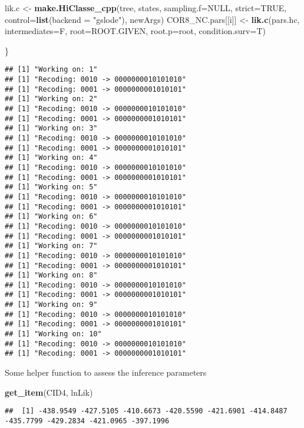 \documentclass[
]{article}
\newenvironment{Shaded}{\begin{snugshade}}{\end{snugshade}}
\newcommand{\AttributeTok}[1]{\textcolor[rgb]{0.13,0.29,0.53}{#1}}
\newcommand{\ConstantTok}[1]{\textcolor[rgb]{0.56,0.35,0.01}{#1}}
\newcommand{\FunctionTok}[1]{\textcolor[rgb]{0.13,0.29,0.53}{\textbf{#1}}}
\newcommand{\NormalTok}[1]{#1}
\newcommand{\OtherTok}[1]{\textcolor[rgb]{0.56,0.35,0.01}{#1}}
\newcommand{\StringTok}[1]{\textcolor[rgb]{0.31,0.60,0.02}{#1}}
\begin{document}
\begin{Shaded}
\begin{Highlighting}[]
\NormalTok{  lik.c }\OtherTok{\textless{}{-}} \FunctionTok{make.HiClasse\_cpp}\NormalTok{(tree, states,  }\AttributeTok{sampling.f=}\ConstantTok{NULL}\NormalTok{,  }\AttributeTok{strict=}\ConstantTok{TRUE}\NormalTok{, }\AttributeTok{control=}\FunctionTok{list}\NormalTok{(}\AttributeTok{backend =} \StringTok{"gslode"}\NormalTok{), newArgs)}
\NormalTok{  COR8\_NC.pars[[i]] }\OtherTok{\textless{}{-}} \FunctionTok{lik.c}\NormalTok{(pars.hc, }\AttributeTok{intermediates=}\NormalTok{F, }\AttributeTok{root=}\NormalTok{ROOT.GIVEN, }\AttributeTok{root.p=}\NormalTok{root, }\AttributeTok{condition.surv=}\NormalTok{T)}
  
\NormalTok{\}}
\end{Highlighting}
\end{Shaded}

\begin{verbatim}
## [1] "Working on: 1"
## [1] "Recoding: 0010 -> 0000000010101010"
## [1] "Recoding: 0001 -> 0000000001010101"
## [1] "Working on: 2"
## [1] "Recoding: 0010 -> 0000000010101010"
## [1] "Recoding: 0001 -> 0000000001010101"
## [1] "Working on: 3"
## [1] "Recoding: 0010 -> 0000000010101010"
## [1] "Recoding: 0001 -> 0000000001010101"
## [1] "Working on: 4"
## [1] "Recoding: 0010 -> 0000000010101010"
## [1] "Recoding: 0001 -> 0000000001010101"
## [1] "Working on: 5"
## [1] "Recoding: 0010 -> 0000000010101010"
## [1] "Recoding: 0001 -> 0000000001010101"
## [1] "Working on: 6"
## [1] "Recoding: 0010 -> 0000000010101010"
## [1] "Recoding: 0001 -> 0000000001010101"
## [1] "Working on: 7"
## [1] "Recoding: 0010 -> 0000000010101010"
## [1] "Recoding: 0001 -> 0000000001010101"
## [1] "Working on: 8"
## [1] "Recoding: 0010 -> 0000000010101010"
## [1] "Recoding: 0001 -> 0000000001010101"
## [1] "Working on: 9"
## [1] "Recoding: 0010 -> 0000000010101010"
## [1] "Recoding: 0001 -> 0000000001010101"
## [1] "Working on: 10"
## [1] "Recoding: 0010 -> 0000000010101010"
## [1] "Recoding: 0001 -> 0000000001010101"
\end{verbatim}

Some helper function to assess the inference parameters

\begin{Shaded}
\begin{Highlighting}[]
\FunctionTok{get\_item}\NormalTok{(CID4, }\StringTok{\textquotesingle{}lnLik\textquotesingle{}}\NormalTok{)}
\end{Highlighting}
\end{Shaded}

\begin{verbatim}
##  [1] -438.9549 -427.5105 -410.6673 -420.5590 -421.6901 -414.8487 -435.7799 -429.2834 -421.0965 -397.1996
\end{verbatim}
\end{document}
